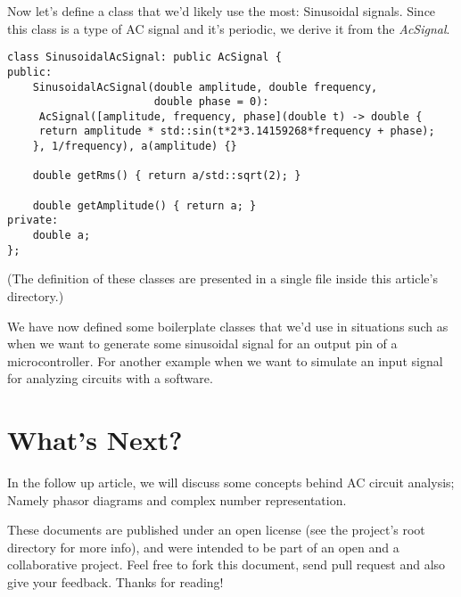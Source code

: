\documentclass{article}
\begin{document}
	Now let's define a class that we'd likely use the most: Sinusoidal signals. Since this class is a type of AC signal and it's periodic, we derive it from the \textit{AcSignal}.
	
	\begin{verbatim}
class SinusoidalAcSignal: public AcSignal {
public:
    SinusoidalAcSignal(double amplitude, double frequency,
                       double phase = 0):
     AcSignal([amplitude, frequency, phase](double t) -> double {
     return amplitude * std::sin(t*2*3.14159268*frequency + phase);
    }, 1/frequency), a(amplitude) {}

    double getRms() { return a/std::sqrt(2); }

    double getAmplitude() { return a; }
private:
    double a;
};
	\end{verbatim}

	(The definition of these classes are presented in a single file inside this article's directory.)
	
	We have now defined some boilerplate classes that we'd use in situations such as when we want to generate some sinusoidal signal for an output pin of a microcontroller. For another example when we want to simulate an input signal for analyzing circuits with a software.
		
	\section{What's Next?}
	In the follow up article, we will discuss some concepts behind AC circuit analysis; Namely phasor diagrams and complex number representation.
	
	These documents are published under an open license (see the project's root directory for more info), and were intended to be part of an open and a collaborative project. Feel free to fork this document, send pull request and also give your feedback. Thanks for reading!
	
\end{document}
